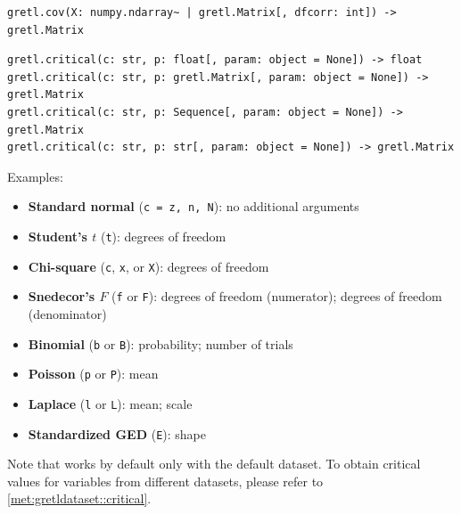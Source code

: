 \label{func:gretl.cov}
\begin{lstlisting}[style=pythonstylefoot]
gretl.cov(X: numpy.ndarray~ | gretl.Matrix[, dfcorr: int]) -> gretl.Matrix
\end{lstlisting}

\label{func:gretl.critical}
\begin{lstlisting}[style=pythonstylefoot]
gretl.critical(c: str, p: float[, param: object = None]) -> float
gretl.critical(c: str, p: gretl.Matrix[, param: object = None]) -> gretl.Matrix
gretl.critical(c: str, p: Sequence[, param: object = None]) -> gretl.Matrix
gretl.critical(c: str, p: str[, param: object = None]) -> gretl.Matrix
\end{lstlisting}
Examples:\newline
{}\\
\begin{footnotesize}\begin{itemize}
		\item \textbf{Standard normal} (\texttt{c = z, n, N}): no additional arguments
		\item \textbf{Student's $t$} (\texttt{t}): degrees of freedom
		\item \textbf{Chi-square} (\texttt{c}, \texttt{x}, or \texttt{X}): degrees of freedom
		\item \textbf{Snedecor's $F$} (\texttt{f} or \texttt{F}): degrees of freedom (numerator); degrees of freedom (denominator)
		\item \textbf{Binomial} (\texttt{b} or \texttt{B}): probability; number of trials
		\item \textbf{Poisson} (\texttt{p} or \texttt{P}): mean
		\item \textbf{Laplace} (\texttt{l} or \texttt{L}): mean; scale
		\item \textbf{Standardized GED} (\texttt{E}): shape
\end{itemize}\end{footnotesize}
Note that 
works by default only with the default dataset. To obtain critical
values for variables from different datasets, please refer to
\ref{met:gretldataset::critical}.

